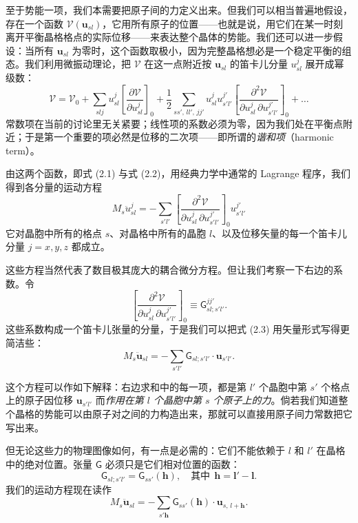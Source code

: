 至于势能一项，我们本需要把原子间的力定义出来。但我们可以相当普遍地假设，存在一个函数 $\mathcal{V}(\mathbf{u}_{sl})$，它用所有原子的位置——也就是说，用它们在某一时刻离开平衡晶格格点的实际位移——来表达整个晶体的势能。我们还可以进一步假设：当所有 $\mathbf{u}_{sl}$ 为零时，这个函数取极小，因为完整晶格想必是一个稳定平衡的组态。我们利用微振动理论，把 $\mathcal{V}$ 在这一点附近按 $\mathbf{u}_{sl}$ 的笛卡儿分量 $u_{sl}^{j}$ 展开成幂级数：
\begin{equation*}
\mathcal{V} = \mathcal{V}_0 + \sum_{slj} u_{sl}^{j} \left[ \frac{\partial \mathcal{V}}{\partial u_{sl}^{j}} \right]_0
+ \frac{1}{2} \sum_{ss',\,ll',\,jj'} u_{sl}^{j} u_{s'l'}^{j'} \left[ \frac{\partial^2 \mathcal{V}}{\partial u_{sl}^{j} \, \partial u_{s'l'}^{j'}} \right]_0 + \ldots
\tag{2.2}
\end{equation*}
常数项在当前的讨论里无关紧要；线性项的系数必须为零，因为我们处在平衡点附近；于是第一个重要的项必然是位移的二次项——即所谓的\emph{谐和项}（harmonic term）。

由这两个函数，即式 (2.1) 与式 (2.2)，用经典力学中通常的 Lagrange 程序，我们得到各分量的运动方程
\begin{equation*}
M_s \ddot{u}_{sl}^{j} = - \sum_{s'l'} \left[ \frac{\partial^2 \mathcal{V}}{\partial u_{sl}^{j} \, \partial u_{s'l'}^{j'}} \right]_0 u_{s'l'}^{j'}
\tag{2.3}
\end{equation*}
它对晶胞中所有的格点 $s$、对晶格中所有的晶胞 $l$、以及位移矢量的每一个笛卡儿分量 $j = x, y, z$ 都成立。

这些方程当然代表了数目极其庞大的耦合微分方程。但让我们考察一下右边的系数。令
\begin{equation*}
\left[ \frac{\partial^2 \mathcal{V}}{\partial u_{sl}^{j} \, \partial u_{s'l'}^{j'}} \right]_0 \equiv \mathsf{G}_{sl;s'l'}^{jj'}.
\tag{2.4}
\end{equation*}
这些系数构成一个笛卡儿张量的分量，于是我们可以把式 (2.3) 用矢量形式写得更简洁些：
\begin{equation*}
M_s \ddot{\mathbf{u}}_{sl} = - \sum_{s'l'} \mathsf{G}_{sl;s'l'} \cdot \mathbf{u}_{s'l'}.
\tag{2.5}
\end{equation*}

这个方程可以作如下解释：右边求和中的每一项，都是第 $l'$ 个晶胞中第 $s'$ 个格点上的原子因位移 $\mathbf{u}_{s'l'}$ 而\emph{作用在第 $l$ 个晶胞中第 $s$ 个原子上的力}。倘若我们知道整个晶格的势能可以由原子对之间的力构造出来，那就可以直接用原子间力常数把它写出来。

但无论这些力的物理图像如何，有一点是必需的：它们不能依赖于 $l$ 和 $l'$ 在晶格中的绝对位置。张量 $\mathsf{G}$ 必须只是它们相对位置的函数：
\begin{equation*}
\mathsf{G}_{sl;s'l'} = \mathsf{G}_{ss'}(\boldsymbol{h}), \quad \text{其中}\ \ \boldsymbol{h} = \boldsymbol{l}' - \boldsymbol{l}.
\tag{2.6}
\end{equation*}
我们的运动方程现在读作
\begin{equation*}
M_s \ddot{\mathbf{u}}_{sl} = - \sum_{s'\boldsymbol{h}} \mathsf{G}_{ss'}(\boldsymbol{h}) \cdot \mathbf{u}_{s,\,l+\boldsymbol{h}}.
\tag{2.7}
\end{equation*}


